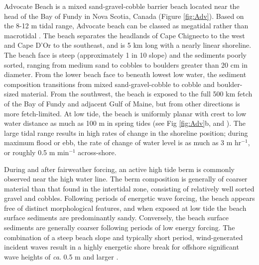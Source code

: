 \documentclass[jmse,article,submit,pdftex,moreauthors]{Definitions/mdpi}
\begin{document}

Advocate Beach is a mixed sand-gravel-cobble barrier beach located near the head of the Bay of Fundy in Nova Scotia, Canada (Figure \ref{fig:Adv}). Based on the 8-12 m tidal range, Advocate beach can be classed as megatidal rather than macrotidal \citep{Levoy_etal2000}. The beach separates the headlands of Cape Chignecto to the west and Cape D'Or to the southeast, and is 5 km long with a nearly linear shoreline. The beach face is steep (approximately 1 in 10 slope) and the sediments poorly sorted, ranging from medium sand to cobbles to boulders greater than 20 cm in diameter. From the lower beach face to beneath lowest low water, the sediment composition transitions from mixed sand-gravel-cobble to cobble and boulder-sized material. From the southwest, the beach is exposed to the full 500 km fetch of the Bay of Fundy and adjacent Gulf of Maine, but from other directions is more fetch-limited. At low tide, the beach is uniformly planar with crest to low water distance as much as 100 m in spring tides (see Fig \ref{fig:Adv}b, and \citep{Taylor_etal1985, Hay_etal2014}). The large tidal range results in high rates of change in the shoreline position; during maximum flood or ebb, the rate of change of water level is as much as 3 m hr$^{-1}$, or roughly 0.5 m min$^{-1}$ across-shore.

During and after fairweather forcing, an active high tide berm is commonly observed near the high water line. The berm composition is generally of coarser material than that found in the intertidal zone, consisting of relatively well sorted gravel and cobbles. Following periods of energetic wave forcing, the beach appears free of distinct morphological features, and when exposed at low tide the beach surface sediments are predominantly sandy. Conversely, the beach surface sediments are generally coarser following periods of low energy forcing. The combination of a steep beach slope and typically short period, wind-generated incident waves result in a highly energetic shore break for offshore significant wave heights of \textit{ca}. 0.5 m and larger \citep{Hay_etal2014}.

\end{document}
